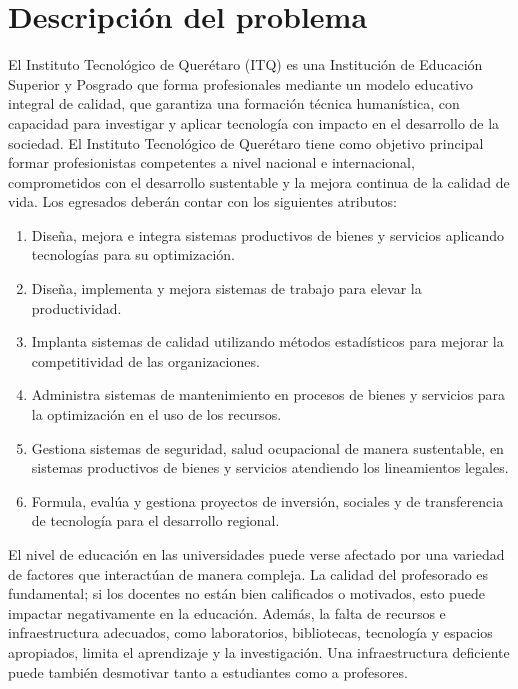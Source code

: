     \section{Descripción del problema}
% 
% 
El Instituto Tecnológico de Querétaro (ITQ) es una Institución de Educación Superior y Posgrado que forma profesionales mediante un modelo educativo integral de calidad, que garantiza una formación técnica humanística, con capacidad para investigar y aplicar tecnología con impacto en el desarrollo de la sociedad. El Instituto Tecnológico de Querétaro  tiene como objetivo principal formar profesionistas competentes a nivel nacional e internacional, comprometidos con el desarrollo sustentable y la mejora continua de la calidad de vida. Los egresados deberán
contar con los siguientes atributos:
\begin{enumerate}
    \item Diseña, mejora e integra sistemas productivos de bienes y servicios aplicando tecnologías para su optimización.
    \item Diseña, implementa y mejora sistemas de trabajo para elevar la productividad.
    \item Implanta sistemas de calidad utilizando métodos estadísticos para mejorar la competitividad de las organizaciones.
    \item Administra sistemas de mantenimiento en procesos de bienes y servicios para la optimización en el uso de los recursos.
    \item Gestiona sistemas de seguridad, salud ocupacional de manera sustentable, en sistemas productivos de bienes y servicios atendiendo los lineamientos legales.
    \item Formula, evalúa y gestiona proyectos de inversión, sociales y de transferencia de tecnología para el desarrollo regional.
\end{enumerate} 
El nivel de educación en las universidades puede verse afectado por una variedad de factores que interactúan de manera compleja. La calidad del profesorado es fundamental; si los docentes no están bien calificados o motivados, esto puede impactar negativamente en la educación. Además, la falta de recursos e infraestructura adecuados, como laboratorios, bibliotecas, tecnología y espacios apropiados, limita el aprendizaje y la investigación. Una infraestructura deficiente puede también desmotivar tanto a estudiantes como a profesores.

